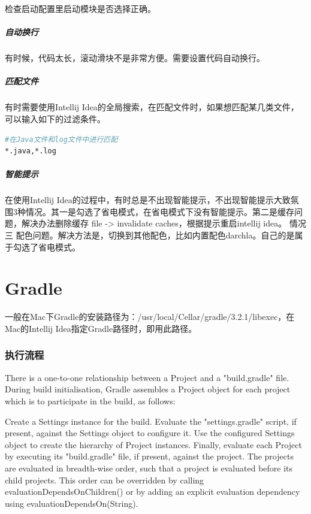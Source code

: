 \documentclass[letter]{book}
\begin{document}
检查启动配置里启动模块是否选择正确。

\paragraph{自动换行}有时候，代码太长，滚动滑块不是非常方便。需要设置代码自动换行。


\paragraph{匹配文件}有时需要使用Intellij Idea的全局搜索，在匹配文件时，如果想匹配某几类文件，可以输入如下的过滤条件。

\begin{lstlisting}[language=Bash]
#在Java文件和log文件中进行匹配
*.java,*.log
\end{lstlisting}

\paragraph{智能提示}

在使用Intellij Idea的过程中，有时总是不出现智能提示，不出现智能提示大致氛围3种情况。其一是勾选了省电模式，在省电模式下没有智能提示。第二是缓存问题，解决办法删除缓存 file -> invalidate caches，根据提示重启intellij idea。 情况三 配色问题。解决方法是，切换到其他配色，比如内置配色darchla。自己的是属于勾选了省电模式。


\chapter{Gradle}

一般在Mac下Gradle的安装路径为：/usr/local/Cellar/gradle/3.2.1/libexec，在Mac的Intellij Idea指定Gradle路径时，即用此路径。

\subsection{执行流程}

There is a one-to-one relationship between a Project and a "build.gradle" file. During build initialisation, Gradle assembles a Project object for each project which is to participate in the build, as follows:

Create a Settings instance for the build.
Evaluate the "settings.gradle" script, if present, against the Settings object to configure it.
Use the configured Settings object to create the hierarchy of Project instances.
Finally, evaluate each Project by executing its "build.gradle" file, if present, against the project. The projects are evaluated in breadth-wise order, such that a project is evaluated before its child projects. This order can be overridden by calling evaluationDependsOnChildren() or by adding an explicit evaluation dependency using evaluationDependsOn(String).
\end{document}
